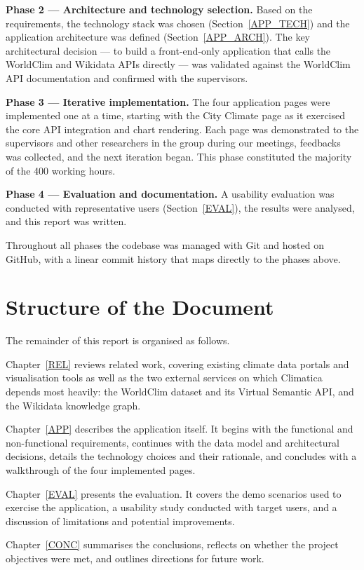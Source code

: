 \textbf{Phase 2 --- Architecture and technology selection.} Based on the
requirements, the technology stack was chosen (Section~\ref{APP_TECH}) and
the application architecture was defined (Section~\ref{APP_ARCH}). The key
architectural decision --- to build a front-end-only application that calls
the WorldClim and Wikidata APIs directly --- was validated against the
WorldClim API documentation and confirmed with the supervisors.

\textbf{Phase 3 --- Iterative implementation.} The four application pages were
implemented one at a time, starting with the City Climate page as it exercised
the core API integration and chart rendering. Each page was demonstrated to the
supervisors and other researchers in the group during our meetings, feedbacks 
was collected, and the next iteration began. This phase constituted the majority 
of the 400 working hours.

\textbf{Phase 4 --- Evaluation and documentation.} A usability evaluation was
conducted with representative users (Section~\ref{EVAL}), the results were
analysed, and this report was written.

Throughout all phases the codebase was managed with Git and hosted on GitHub,
with a linear commit history that maps directly to the phases above.

\section{Structure of the Document}\label{INTRO_EST}

The remainder of this report is organised as follows.

Chapter~\ref{REL} reviews related work, covering existing climate data portals
and visualisation tools as well as the two external services on which Climatica
depends most heavily: the WorldClim dataset and its Virtual Semantic API, and
the Wikidata knowledge graph.

Chapter~\ref{APP} describes the application itself. It begins with the
functional and non-functional requirements, continues with the data model and
architectural decisions, details the technology choices and their rationale, and
concludes with a walkthrough of the four implemented pages.

Chapter~\ref{EVAL} presents the evaluation. It covers the demo scenarios used
to exercise the application, a usability study conducted with target users, and
a discussion of limitations and potential improvements.

Chapter~\ref{CONC} summarises the conclusions, reflects on whether the project
objectives were met, and outlines directions for future work.